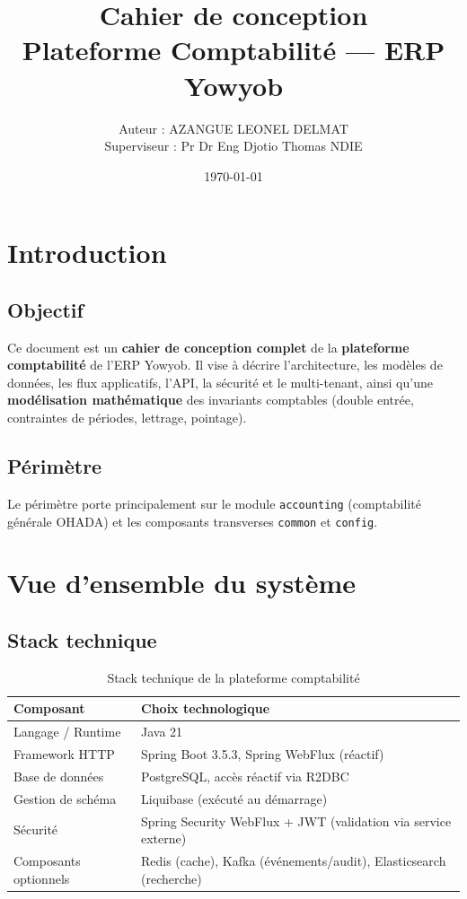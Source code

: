 \documentclass[12pt,a4paper]{report}
\title{Cahier de conception\\\large Plateforme Comptabilité --- ERP Yowyob}
\author{Auteur : AZANGUE LEONEL DELMAT\\Superviseur : Pr Dr Eng Djotio Thomas NDIE}
\date{\today}
\begin{document}
\maketitle
\tableofcontents
\listoffigures

\chapter{Introduction}
\section{Objectif}
Ce document est un \textbf{cahier de conception complet} de la \textbf{plateforme comptabilité} de l'ERP Yowyob.
Il vise à décrire l'architecture, les modèles de données, les flux applicatifs, l'API, la sécurité et le multi-tenant, ainsi qu'une \textbf{modélisation mathématique} des invariants comptables (double entrée, contraintes de périodes, lettrage, pointage).

\section{Périmètre}
Le périmètre porte principalement sur le module \texttt{accounting} (comptabilité générale OHADA) et les composants transverses \texttt{common} et \texttt{config}.

\chapter{Vue d'ensemble du système}
\section{Stack technique}
\begin{table}[H]
\centering
\begin{tabularx}{\textwidth}{@{}lX@{}}
\toprule
\textbf{Composant} & \textbf{Choix technologique} \\
\midrule
Langage / Runtime & Java 21 \\
Framework HTTP & Spring Boot 3.5.3, Spring WebFlux (réactif) \\
Base de données & PostgreSQL, accès réactif via R2DBC \\
Gestion de schéma & Liquibase (exécuté au démarrage) \\
Sécurité & Spring Security WebFlux + JWT (validation via service externe) \\
Composants optionnels & Redis (cache), Kafka (événements/audit), Elasticsearch (recherche) \\
\bottomrule
\end{tabularx}
\caption{Stack technique de la plateforme comptabilité}
\end{table}
\end{document}
